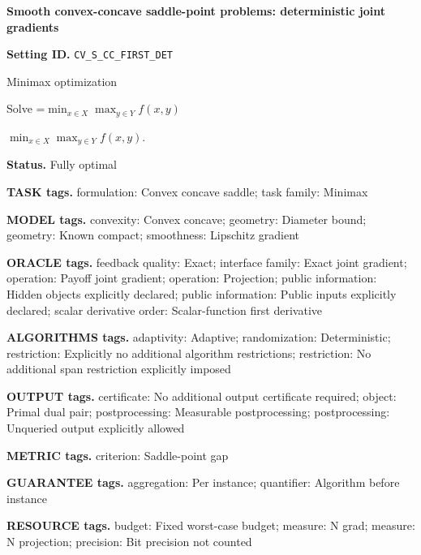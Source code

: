 \documentclass[10pt,a4paper]{article}
\newcommand{\AtlasMath}[1]{\par\begingroup\centering\setbox0=\hbox{$\displaystyle #1$}\ifdim\wd0>1.4\linewidth\typeout{ATLAS WIDE FORMULA: \the\wd0}\fi\ifdim\wd0>\linewidth\resizebox{\linewidth}{!}{\box0}\else\box0\fi\par\endgroup}
\newcommand{\AtlasInlineMath}[1]{\begingroup\setbox0=\hbox{$#1$}\ifdim\wd0>.4\linewidth\endgroup\AtlasMath{#1}\else\endgroup$#1$\fi}
\begin{document}
\raggedright

{\LARGE\bfseries\sffamily\color{AtlasNavy} Smooth convex-concave saddle-point problems: deterministic joint gradients\par}\vspace{5pt}


\textbf{Setting ID.} \texttt{CV\_\allowbreak{}S\_\allowbreak{}CC\_\allowbreak{}FIRST\_\allowbreak{}DET}



Minimax optimization



Solve \AtlasInlineMath{\min_{x\in X}\max_{y\in Y}f(x,y)}.



\textbf{Status.} Fully optimal



\textbf{TASK tags.} formulation: Convex concave saddle; task family: Minimax



\textbf{MODEL tags.} convexity: Convex concave; geometry: Diameter bound; geometry: Known compact; smoothness: Lipschitz gradient



\textbf{ORACLE tags.} feedback quality: Exact; interface family: Exact joint gradient; operation: Payoff joint gradient; operation: Projection; public information: Hidden objects explicitly declared; public information: Public inputs explicitly declared; scalar derivative order: Scalar-function first derivative



\textbf{ALGORITHMS tags.} adaptivity: Adaptive; randomization: Deterministic; restriction: Explicitly no additional algorithm restrictions; restriction: No additional span restriction explicitly imposed



\textbf{OUTPUT tags.} certificate: No additional output certificate required; object: Primal dual pair; postprocessing: Measurable postprocessing; postprocessing: Unqueried output explicitly allowed



\textbf{METRIC tags.} criterion: Saddle-point gap



\textbf{GUARANTEE tags.} aggregation: Per instance; quantifier: Algorithm before instance



\textbf{RESOURCE tags.} budget: Fixed worst-case budget; measure: N grad; measure: N projection; precision: Bit precision not counted
\end{document}
